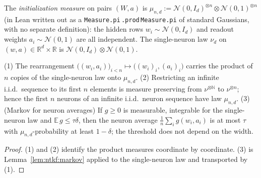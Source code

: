 \begin{definition}\label{def:ntktl:init}
  \leanok
The \emph{initialization measure} on pairs $(W,a)$ is $\mu_{n,d}:=\mathcal N(0,I_d)^{\otimes n}\otimes\mathcal N(0,1)^{\otimes n}$ (in Lean written out as a \texttt{Measure.pi}\,\texttt{.prod}\,\texttt{Measure.pi} of standard Gaussians, with no separate definition): the hidden rows
$w_i\sim\mathcal N(0,I_d)$ and readout weights $a_i\sim\mathcal N(0,1)$ are all independent. The single-neuron law $\nu_d$ on $(w,a)\in\mathbb R^d\times\mathbb R$
is $\mathcal N(0,I_d)\otimes\mathcal N(0,1)$.
\end{definition}

\begin{lemma}\label{lem:ntktl:neuronSeq}
  \leanok
(1) The rearrangement $\bigl((w_i,a_i)\bigr)_{i<n}\mapsto\bigl((w_i)_i,(a_i)_i\bigr)$ carries the product of $n$ copies of the single-neuron law onto $\mu_{n,d}$.
(2) Restricting an infinite i.i.d.\ sequence to its first $n$ elements is measure preserving from $\nu^{\otimes\mathbb N}$ to $\nu^{\otimes n}$; hence the first $n$ neurons of an infinite i.i.d.\
neuron sequence have law $\mu_{n,d}$.
(3) (Markov for neuron averages) If $g\ge0$ is measurable, integrable for the single-neuron law and $\mathbb E\,g\le\tau\delta$, then the neuron average $\frac1n\sum_ig(w_i,a_i)$ is at most $\tau$ with
$\mu_{n,d}$-probability at least $1-\delta$; the threshold does not depend on the width.
\end{lemma}

\begin{proof}
  \leanok
(1) and (2) identify the product measures coordinate by coordinate. (3) is Lemma~\ref{lem:ntkf:markov} applied to the single-neuron law and transported by (1).
\end{proof}

